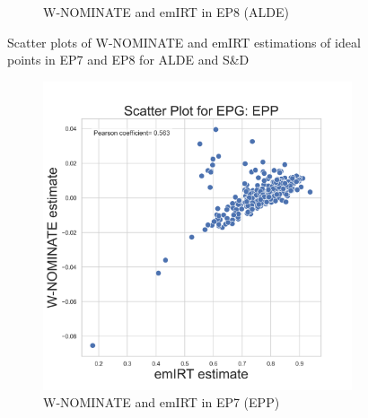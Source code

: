 \documentclass[a4paper,12pt]{report}
\begin{document}
\begin{figure}[H]
\begin{subfigure}[b]{0.48\textwidth}
            \caption{W-NOMINATE and emIRT in EP8 (ALDE)}
            \label{fig:WNOMINATE_ALDESCATTER_8}
        \end{subfigure}
        \caption{Scatter plots of W-NOMINATE and emIRT estimations of ideal points in EP7 and EP8 for ALDE and S&D}
        \label{fig:WNOMINATE_SCATTER_parties}
    \end{figure}

    \begin{figure}[H]
        \centering
        \begin{subfigure}[b]{0.48\textwidth}
            \centering
            \includegraphics[width=\textwidth]{Graphs/ScatterEMWNOMINATE_7_EPG_EPP}
            \caption{W-NOMINATE and emIRT in EP7 (EPP)}
            \label{fig:WNOMINATE_EPP_SCATTER_7}
        \end{subfigure}
        \hfill
        \begin{subfigure}[b]{0.48\textwidth}
            \centering

\end{subfigure}
\end{figure}
\end{document}
